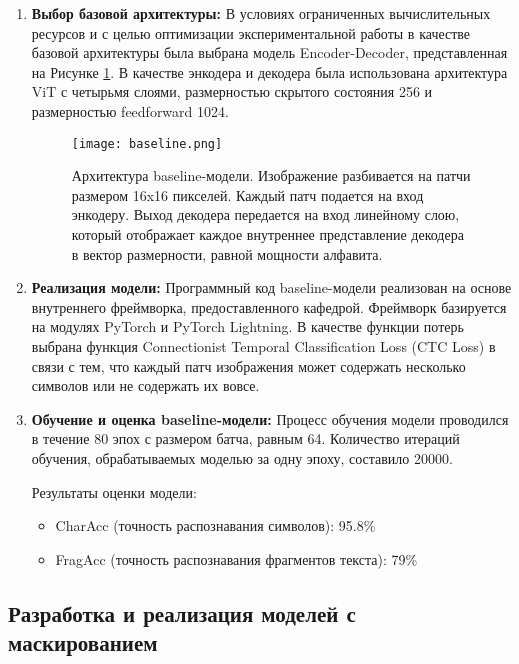 \begin{enumerate}
   \item \textbf{Выбор базовой архитектуры:}
   В условиях ограниченных вычислительных ресурсов и с целью оптимизации экспериментальной работы в качестве базовой архитектуры была выбрана модель Encoder-Decoder, представленная на Рисунке \ref{2}. В качестве энкодера и декодера была использована архитектура ViT \cite{dosovitskiy2020image} с четырьмя слоями, размерностью скрытого состояния 256 и размерностью feedforward 1024. 

    \begin{figure}[h!]
     \texttt{[image: baseline.png]}
     \caption{ Архитектура baseline-модели. Изображение разбивается на патчи размером 16x16 пикселей. Каждый патч подается на вход энкодеру. Выход декодера передается на вход линейному слою, который отображает каждое внутреннее представление декодера в вектор размерности, равной мощности алфавита.}
     \label{2} 
   \end{figure}
   \item \textbf{Реализация модели:}
   Программный код baseline-модели реализован на основе внутреннего фреймворка, предоставленного кафедрой. Фреймворк базируется на модулях PyTorch и PyTorch Lightning.
   В качестве функции потерь выбрана функция Connectionist Temporal Classification Loss (CTC Loss) в связи с тем, что каждый патч изображения может содержать несколько символов или не содержать их вовсе.
   
   
   \item \textbf{Обучение и оценка baseline-модели:}
   Процесс обучения модели проводился в течение 80 эпох с размером батча, равным 64. Количество итераций обучения, обрабатываемых моделью за одну эпоху, составило 20000.

   Результаты оценки модели:
   \begin{itemize}
     \item CharAcc (точность распознавания символов): 95.8\%
     \item FragAcc (точность распознавания фрагментов текста): 79\%
   \end{itemize}
\end{enumerate}

\subsection{Разработка и реализация моделей с маскированием}


